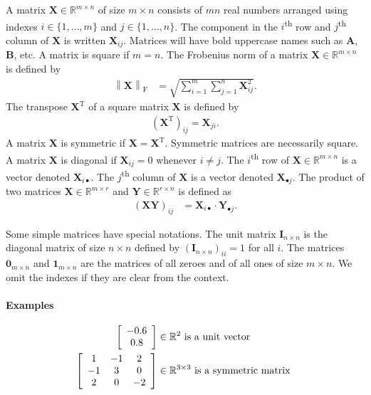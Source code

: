 \documentclass[11pt,a4paper]{book}
\newcommand{\syRank}{r}
\begin{document}
A matrix $\mathbf X \in \mathbb R^{m\times n}$ of size $m \times n$ consists of $mn$
real numbers arranged using indexes $i\in \{1, \ldots, m\}$ and $j\in
\{1, \ldots, n\}$.  
The component in the $i$\textsuperscript{th} row and $j$\textsuperscript{th}
column of $\mathbf X$ is written $\mathbf X_{ij}$. 
Matrices will have bold uppercase names such as $\mathbf A$, $\mathbf
B$, etc. 
A matrix is square if $m=n$. 
The Frobenius norm of a matrix $\mathbf X \in \mathbb R^{m \times n}$ is
defined by
\begin{align}
\left\| \mathbf X \right \|_{\mathrm F} &= 
\sqrt{ \sum_{i=1}^m \sum_{j=1}^n \mathbf X_{ij}^2 }. 
\label{eq:frobenius-norm}
\end{align}
The transpose $\mathbf X^{\mathrm T}$ of a square matrix $\mathbf X$ is defined
by 
\begin{align}
(\mathbf X^{\mathrm T})_{ij} = \mathbf X_{ji}. 
  \label{eq:matrix-transpose}
\end{align}
A matrix $\mathbf X$ is symmetric if $\mathbf X = \mathbf X^{\mathrm
  T}$. Symmetric matrices are necessarily square. 
A matrix $\mathbf X$ is diagonal if $\mathbf X_{ij}=0$ whenever $i \neq
j$. 
The $i$\textsuperscript{th} row of $\mathbf X \in \mathbb R^{m \times n}$
is a vector denoted $\mathbf X_{i\bullet}$. 
The $j$\textsuperscript{th} column of $\mathbf X$ is a vector denoted
$\mathbf X_{\bullet j}$. 
The product of two matrices $\mathbf X\in \mathbb R^{m\times \syRank}$ and
$\mathbf Y\in \mathbb R^{\syRank\times n}$ is defined as
\begin{align}
  (\mathbf X \mathbf Y)_{ij} &= \mathbf X_{i\bullet} \cdot \mathbf
  Y_{\bullet j}. 
\end{align}

Some simple matrices have special notations. 
The unit matrix $\mathbf I_{n \times n}$ is the diagonal matrix of size $n\times n$
defined by $(\mathbf I_{n \times n})_{ii}=1$ for all $i$. 
The matrices $\mathbf 0_{m\times n}$ and $\mathbf 1_{m\times n}$ are the
matrices of all zeroes and of all ones of size $m\times n$.
We omit the indexes if they are clear from the context. 

\paragraph{Examples}
\begin{align*}
  \left[ \begin{array}{c} -0.6 \\ 0.8 \end{array}\right]&\in\mathbb R^2 \textnormal{ is
    a unit vector } \\
  \left[ \begin{array}{ccc} 1 & -1 & 2 \\ -1 & 3 & 0 \\ 2 & 0 &
      -2\end{array}\right] &\in \mathbb R^{3\times 3} \textnormal{ is a
    symmetric matrix }
\end{align*}
\end{document}
